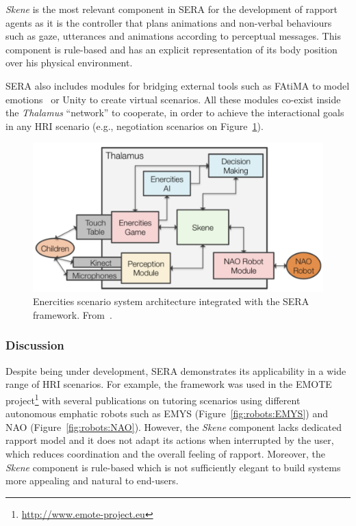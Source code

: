 \textit{Skene} is the most relevant component in \ac{SERA} for the development of rapport agents as it is the controller that plans animations and non-verbal behaviours such as gaze, utterances and animations according to perceptual messages. This component is rule-based and has an explicit representation of its body position over his physical environment.

SERA also includes modules for bridging external tools such as FAtiMA to model emotions~\cite{Dias2011} or Unity to create virtual scenarios. All these modules co-exist inside the \textit{Thalamus} ``network'' to cooperate, in order to achieve the interactional goals in any \ac{HRI} scenario (e.g., negotiation scenarios on Figure~\ref{fig:SERA:Examples}).

\begin{figure}[H]
	\centering
	\includegraphics[width=0.6\linewidth]{images/SERA_ExSystemEC.png}
	\caption{Enercities scenario system architecture integrated with the SERA framework. From~\cite{Tullio2015}.}
	\label{fig:SERA:Examples}
\end{figure}


\subsubsection*{Discussion}

Despite being under development, \ac{SERA} demonstrates its applicability in a wide range of \ac{HRI} scenarios. For example, the framework was used in the EMOTE project\footnote{\url{http://www.emote-project.eu}} with several publications on tutoring scenarios using different autonomous emphatic robots such as \ac{EMYS} (Figure~\ref{fig:robots:EMYS}) and NAO (Figure~\ref{fig:robots:NAO}). However, the \textit{Skene} component lacks dedicated rapport model and it does not adapt its actions when interrupted by the user, which reduces coordination and the overall feeling of rapport. Moreover, the \textit{Skene} component is rule-based which is not sufficiently elegant to build systems more appealing and natural to end-users.

